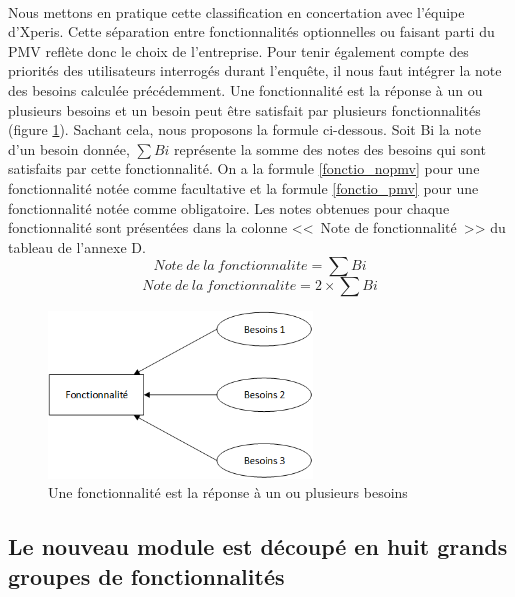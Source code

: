 			\paragraph{}%
			Nous mettons en pratique cette classification en concertation avec l'équipe
			d'Xperis. Cette séparation entre fonctionnalités optionnelles ou faisant
			parti du PMV reflète donc le choix de l'entreprise.
			Pour tenir également compte des priorités des utilisateurs interrogés durant
			l'enquête, il nous faut intégrer la note des besoins calculée précédemment.
			Une fonctionnalité est la réponse à un ou plusieurs besoins et un besoin peut
			être satisfait par plusieurs fonctionnalités (figure \ref{mapping_besoins}).
			Sachant cela, nous proposons la formule ci-dessous.
			Soit Bi la note d'un besoin donnée, \begin{math}\sum Bi\end{math} représente
			la somme des notes des besoins qui sont satisfaits par cette fonctionnalité.
			On a la formule \ref{fonctio_nopmv} pour une fonctionnalité notée comme
			facultative et la formule \ref{fonctio_pmv} pour une fonctionnalité notée
			comme obligatoire. Les notes obtenues pour chaque fonctionnalité sont
			présentées dans la colonne <<~Note de fonctionnalité~>> du tableau de
			l'annexe D.
			\begin{equation}
				\label{fonctio_nopmv}
				Note\ de\ la\ fonctionnalite=\sum Bi
			\end{equation}
			\begin{equation}
				\label{fonctio_pmv}
				Note\ de\ la\ fonctionnalite=2\times \sum Bi
			\end{equation}
			\begin{figure}[H]
				\centering
				\includegraphics[width=7cm]{../img/part2/mapping_besoins.png}
				\caption{\label{mapping_besoins} Une fonctionnalité est la réponse à un ou
				plusieurs besoins}
			\end{figure}
			
		\subsection{Le nouveau module est découpé en huit grands groupes de
		fonctionnalités}
